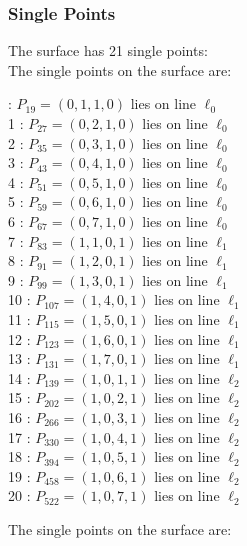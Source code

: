 \documentclass{article}
\begin{document}
{\subsubsection*{Single Points}
The surface has 21 single points:\\
The single points on the surface are:\\
\begin{multicols}{2}
 : $P_{19}=( 0, 1, 1, 0 )$ lies on line $\ell_{0}$\\
1 : $P_{27}=( 0, 2, 1, 0 )$ lies on line $\ell_{0}$\\
2 : $P_{35}=( 0, 3, 1, 0 )$ lies on line $\ell_{0}$\\
3 : $P_{43}=( 0, 4, 1, 0 )$ lies on line $\ell_{0}$\\
4 : $P_{51}=( 0, 5, 1, 0 )$ lies on line $\ell_{0}$\\
5 : $P_{59}=( 0, 6, 1, 0 )$ lies on line $\ell_{0}$\\
6 : $P_{67}=( 0, 7, 1, 0 )$ lies on line $\ell_{0}$\\
7 : $P_{83}=( 1, 1, 0, 1 )$ lies on line $\ell_{1}$\\
8 : $P_{91}=( 1, 2, 0, 1 )$ lies on line $\ell_{1}$\\
9 : $P_{99}=( 1, 3, 0, 1 )$ lies on line $\ell_{1}$\\
10 : $P_{107}=( 1, 4, 0, 1 )$ lies on line $\ell_{1}$\\
11 : $P_{115}=( 1, 5, 0, 1 )$ lies on line $\ell_{1}$\\
12 : $P_{123}=( 1, 6, 0, 1 )$ lies on line $\ell_{1}$\\
13 : $P_{131}=( 1, 7, 0, 1 )$ lies on line $\ell_{1}$\\
14 : $P_{139}=( 1, 0, 1, 1 )$ lies on line $\ell_{2}$\\
15 : $P_{202}=( 1, 0, 2, 1 )$ lies on line $\ell_{2}$\\
16 : $P_{266}=( 1, 0, 3, 1 )$ lies on line $\ell_{2}$\\
17 : $P_{330}=( 1, 0, 4, 1 )$ lies on line $\ell_{2}$\\
18 : $P_{394}=( 1, 0, 5, 1 )$ lies on line $\ell_{2}$\\
19 : $P_{458}=( 1, 0, 6, 1 )$ lies on line $\ell_{2}$\\
20 : $P_{522}=( 1, 0, 7, 1 )$ lies on line $\ell_{2}$\\
\end{multicols}
The single points on the surface are:\\
}
\end{document}
